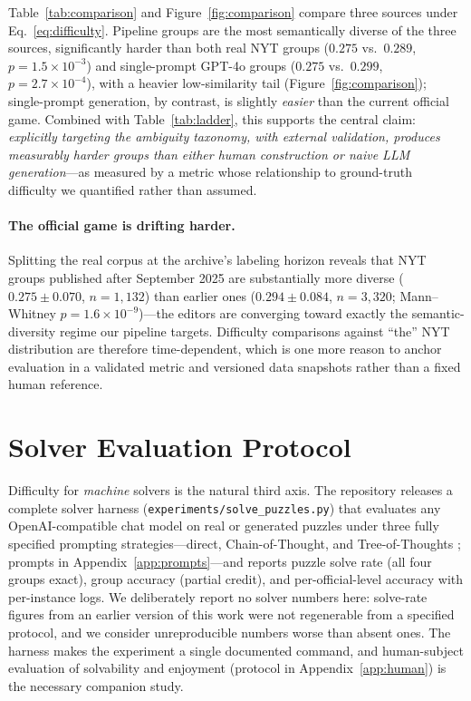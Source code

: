 \documentclass[11pt]{article}
\begin{document}
Table~\ref{tab:comparison} and Figure~\ref{fig:comparison} compare three sources under Eq.~\ref{eq:difficulty}. Pipeline groups are the most semantically diverse of the three sources, significantly harder than both real NYT groups ($0.275$ vs.\ $0.289$, $p=1.5\times10^{-3}$) and single-prompt GPT-4o groups ($0.275$ vs.\ $0.299$, $p=2.7\times10^{-4}$), with a heavier low-similarity tail (Figure~\ref{fig:comparison}); single-prompt generation, by contrast, is slightly \emph{easier} than the current official game. Combined with Table~\ref{tab:ladder}, this supports the central claim: \emph{explicitly targeting the ambiguity taxonomy, with external validation, produces measurably harder groups than either human construction or naive LLM generation}---as measured by a metric whose relationship to ground-truth difficulty we quantified rather than assumed.

\paragraph{The official game is drifting harder.} Splitting the real corpus at the archive's labeling horizon reveals that NYT groups published after September 2025 are substantially more diverse ($0.275 \pm 0.070$, $n{=}1{,}132$) than earlier ones ($0.294 \pm 0.084$, $n{=}3{,}320$; Mann--Whitney $p=1.6\times10^{-9}$)---the editors are converging toward exactly the semantic-diversity regime our pipeline targets. Difficulty comparisons against ``the'' NYT distribution are therefore time-dependent, which is one more reason to anchor evaluation in a validated metric and versioned data snapshots rather than a fixed human reference.

\section{Solver Evaluation Protocol}
\label{sec:solver}

Difficulty for \emph{machine} solvers is the natural third axis. The repository releases a complete solver harness (\texttt{experiments/solve\_puzzles.py}) that evaluates any OpenAI-compatible chat model on real or generated puzzles under three fully specified prompting strategies---direct, Chain-of-Thought, and Tree-of-Thoughts \citep{wei2022chain, yao2023tree}; prompts in Appendix~\ref{app:prompts}---and reports puzzle solve rate (all four groups exact), group accuracy (partial credit), and per-official-level accuracy with per-instance logs. We deliberately report no solver numbers here: solve-rate figures from an earlier version of this work were not regenerable from a specified protocol, and we consider unreproducible numbers worse than absent ones. The harness makes the experiment a single documented command, and human-subject evaluation of solvability and enjoyment (protocol in Appendix~\ref{app:human}) is the necessary companion study.
\end{document}
